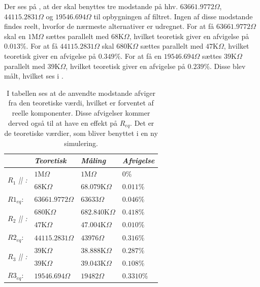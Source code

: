 Der ses på , at der skal benyttes tre modstande på hhv. $63661.9772\Omega$, $44115.2831\Omega$ og $19546.694\Omega$ til opbygningen af filtret. Ingen af disse modstande findes reelt, hvorfor de nærmeste alternativer er udregnet. For at få $63661.9772\Omega$ skal en $1$M$\Omega$  sættes parallelt med $68$K$\Omega$, hvilket teoretisk giver en afvigelse på $0.013\%$. For at få $44115.2831\Omega$ skal $680$K$\Omega$ sættes parallelt med $47$K$\Omega$, hvilket teoretisk giver en afvigelse på $0.349\%$. For at få en $19546.694\Omega$ sættes $39$K$\Omega$ parallelt med $39$K$\Omega$, hvilket teoretisk giver en afvigelse på $0.239\%$. Disse blev målt, hvilket ses i .
\begin{table}[H]
	\centering
	\begin{tabular}{|l|l|l|l|}
		\hline
		\textit{}                                     & \textit{Teoretisk} & \textit{Måling}    & \textit{Afvigelse} \\ \hline
		\multirow{2}{*}{\textit{$R_{1}$ || :}} & $1$M$\Omega$       & $1$M$\Omega$  & $0\%$           \\ \cline{2-4} 
		& $68$K$\Omega$      & $68.079$K$\Omega$ & $0.011\%$           \\ \hline
		$R1_{eq}$: & $63661.9772\Omega$ & $63633\Omega$ &  $0.046\%$ \\ \hline
		\multirow{2}{*}{\textit{$R_{2}$ || :}} & $680$K$\Omega$     & $682.840$K$\Omega$  & $0.418\%$        \\ \cline{2-4} 
		& $47$K$\Omega$      & $47.004$K$\Omega$ & $0.010\%$           \\ \hline
		$R2_{eq}$: & $44115.2831\Omega$ & $43976\Omega$ & $0.316\%$ \\ \hline
		\multirow{2}{*}{\textit{$R_{3}$ || :}} & $39$K$\Omega$      & $38.888$K$\Omega$    & $0.287\%$           \\ \cline{2-4} 
		& $39$K$\Omega$     & $39.043$K$\Omega$        & $0.108\%$           \\ \hline
		$R3_{eq}$: & $19546.694\Omega$ & $19482\Omega$  & $0.3310\%$ \\ \hline
	\end{tabular}
	\caption{I tabellen ses at de anvendte modstande afviger fra den teoretiske værdi, hvilket er forventet af reelle komponenter. Disse afvigelser kommer derved også til at have en effekt på $R_{eq}$. Det er de teoretiske værdier, som bliver benyttet i en ny simulering.}
	\label{Tab:Maalingafmodstande_filter}
\end{table}
